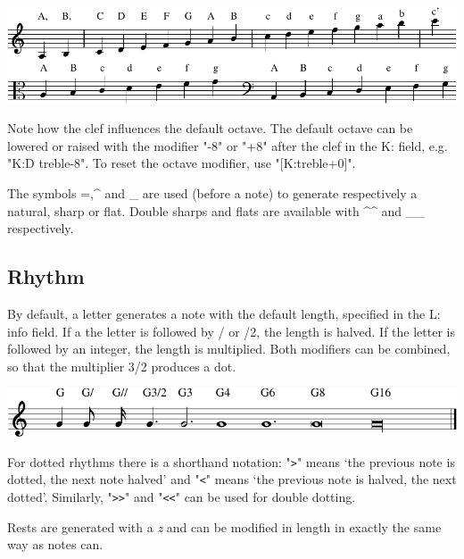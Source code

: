 \documentclass[a4paper]{article}
\begin{document}
\begin{center}
\includegraphics{sample1}
\end{center}

Note how the clef influences the default octave. 
The default octave can be lowered or raised with the modifier "-8" or
"+8" after the clef in the K: field, e.g. "K:D treble-8". To reset
the octave modifier, use "[K:treble+0]".
\par
{}   
The symbols =,\^{ } and \_  are  used  (before  a  note)  to  generate
respectively a natural, sharp or flat. 
Double sharps and flats are available with \^{ }\^{ } and \_\_ respectively.

\subsection{Rhythm}
\label{sec:MusicRhythm}
By default, a letter generates a note with the default length,
specified in the L: info field. If a the letter is followed by /
or /2, the length is halved. If the letter is followed by an integer,
the length is multiplied. Both modifiers can be combined, so that
the multiplier 3/2 produces a dot.

\begin{center}
\includegraphics{sample2}
\end{center}

\par
{} For dotted rhythms 
there is a shorthand notation: "\verb$>$" means
`the previous note is dotted, the next note halved' and "\verb$<$" means
`the previous note is halved, the next dotted'. Similarly, "\verb$>>$"
and "\verb$<<$" can be used for double dotting.

\par
{}
Rests are generated with a {\it z} and can be modified in 
length  in exactly the same way as notes can.
\end{document}
